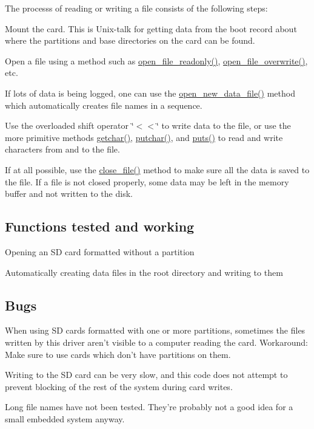 The processs of reading or writing a file consists of the following steps\-: \begin{DoxyItemize}
\item Mount the card. This is Unix-\/talk for getting data from the boot record about where the partitions and base directories on the card can be found. \item Open a file using a method such as \hyperlink{classsd__card_a0e81d537338e6bcb69a7623087272ca7}{open\-\_\-file\-\_\-readonly()}, \hyperlink{classsd__card_a90cb0c0eb0dd6e91704f11329721742b}{open\-\_\-file\-\_\-overwrite()}, etc. \item If lots of data is being logged, one can use the \hyperlink{classsd__card_a01bf6f40225a91995831f6341eacccbe}{open\-\_\-new\-\_\-data\-\_\-file()} method which automatically creates file names in a sequence. \item Use the overloaded shift operator \char`\"{}$<$$<$\char`\"{} to write data to the file, or use the more primitive methods \hyperlink{classbase__text__serial_a7c1fd4a7965a273cd7b24ca543f8dbae}{getchar()}, \hyperlink{classsd__card_a24780513a0db84cd83cbd5d77437981b}{putchar()}, and \hyperlink{classsd__card_afadf1e3a3b449e9ab992ac147a837562}{puts()} to read and write characters from and to the file. \item If at all possible, use the \hyperlink{classsd__card_ad8edd6731e877aed7b4cd953a5f4b78d}{close\-\_\-file()} method to make sure all the data is saved to the file. If a file is not closed properly, some data may be left in the memory buffer and not written to the disk.\end{DoxyItemize}
\hypertarget{classsd__card_sd_tested}{}\subsection{Functions tested and working}\label{classsd__card_sd_tested}
\begin{DoxyItemize}
\item Opening an S\-D card formatted without a partition \item Automatically creating data files in the root directory and writing to them\end{DoxyItemize}
\hypertarget{classsd__card_sd_bugs}{}\subsection{Bugs}\label{classsd__card_sd_bugs}
\begin{DoxyItemize}
\item When using S\-D cards formatted with one or more partitions, sometimes the files written by this driver aren't visible to a computer reading the card. Workaround\-: Make sure to use cards which don't have partitions on them. \item Writing to the S\-D card can be very slow, and this code does not attempt to prevent blocking of the rest of the system during card writes. \item Long file names have not been tested. They're probably not a good idea for a small embedded system anyway.\end{DoxyItemize}
